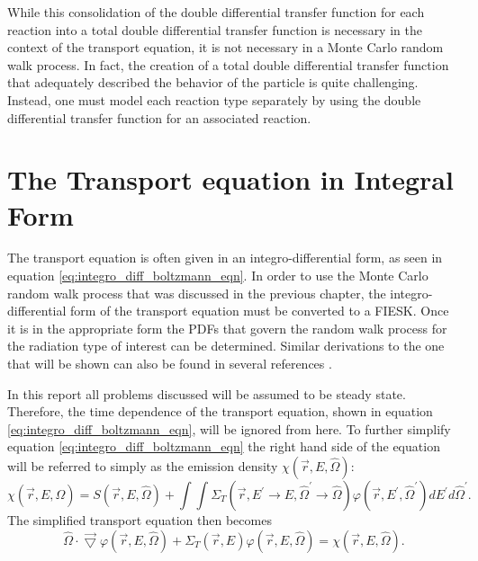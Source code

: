 While this consolidation of the double differential transfer function for each 
reaction into a total double differential transfer function is necessary in the 
context of the transport equation, it is not necessary in a Monte Carlo random 
walk process. In fact, the creation of a total double differential transfer 
function that adequately described the behavior of the particle is quite 
challenging. Instead, one must model each reaction type separately by using the 
double differential transfer function for an associated reaction. 

\section{The Transport equation in Integral Form}
The transport equation is often given in an integro-differential form, as seen 
in equation \ref{eq:integro_diff_boltzmann_eqn}. In order to use the Monte 
Carlo random walk process that was discussed in the previous chapter, the 
integro-differential form of the transport equation must be converted to a 
FIESK. Once it is in the appropriate form the PDFs that govern the random walk 
process for the radiation type of interest can be determined. Similar 
derivations to the one that will be shown can also be found in several 
references \citep{lewis_computational_1993, hoogenboom_adjoint_1977, irving_adjoint_1971, bell_nuclear_1979}.
 
In this report all problems discussed will be assumed to be steady state. 
Therefore, the time dependence of the transport equation, shown in equation 
\ref{eq:integro_diff_boltzmann_eqn}, will be ignored from here. To further 
simplify equation \ref{eq:integro_diff_boltzmann_eqn} the right hand side of 
the equation will be referred to simply as the emission density 
$\chi(\vec{r},E,\hat{\Omega})$:
\begin{equation}
    \chi(\vec{r},E,\hat{\Omega}) = S(\vec{r},E,\hat{\Omega}) +
    \int\int \Sigma_T(\vec{r},E^{'} \to E,\hat{\Omega}^{'} \to \hat{\Omega})
    \varphi(\vec{r},E^{'},\hat{\Omega}^{'}) dE^{'}d\hat{\Omega}^{'}.
  \label{eq:emission_density}
\end{equation}
The simplified transport equation then becomes
\begin{equation}
  \hat{\Omega} \cdot \vec{\bigtriangledown} \varphi(\vec{r},E,\hat{\Omega})
  + \Sigma_T(\vec{r},E) \varphi(\vec{r},E,\hat{\Omega}) =  
 \chi(\vec{r},E,\hat{\Omega}).
  \label{eq:reduced_transport_eqn}
\end{equation}

